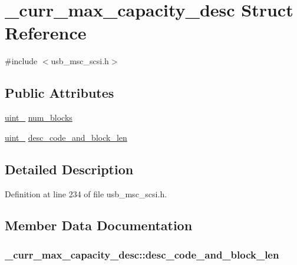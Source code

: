 \hypertarget{struct__curr__max__capacity__desc}{}\section{\+\_\+curr\+\_\+max\+\_\+capacity\+\_\+desc Struct Reference}
\label{struct__curr__max__capacity__desc}


{\ttfamily \#include $<$usb\+\_\+msc\+\_\+scsi.\+h$>$}

\subsection*{Public Attributes}
\begin{DoxyCompactItemize}
\item 
\hyperlink{types_8h_a5532400b872b4aa84e54335bf458a318}{uint\+\_} \hyperlink{struct__curr__max__capacity__desc_a6cfb93ee5e37da46ffd68b17990fe298}{num\+\_\+blocks}
\item 
\hyperlink{types_8h_a5532400b872b4aa84e54335bf458a318}{uint\+\_} \hyperlink{struct__curr__max__capacity__desc_a03e560ef0acd3ca948e35bc3d4ae0c4e}{desc\+\_\+code\+\_\+and\+\_\+block\+\_\+len}
\end{DoxyCompactItemize}


\subsection{Detailed Description}


Definition at line 234 of file usb\+\_\+msc\+\_\+scsi.\+h.



\subsection{Member Data Documentation}
\subsubsection[{\texorpdfstring{desc\+\_\+code\+\_\+and\+\_\+block\+\_\+len}{desc_code_and_block_len}}]{ \+\_\+curr\+\_\+max\+\_\+capacity\+\_\+desc\+::desc\+\_\+code\+\_\+and\+\_\+block\+\_\+len}\hypertarget{struct__curr__max__capacity__desc_a03e560ef0acd3ca948e35bc3d4ae0c4e}{}\label{struct__curr__max__capacity__desc_a03e560ef0acd3ca948e35bc3d4ae0c4e}


